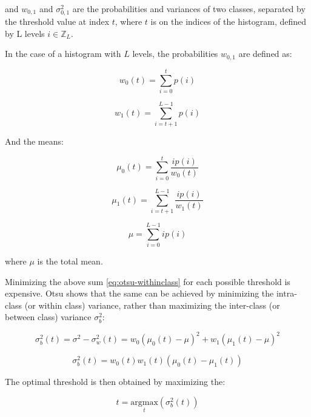 and $w_{0,1}$ and $\sigma_{0,1}^2$ are the probabilities and variances of two classes, separated by the threshold value at index $t$, where $t$ is on the indices of the histogram, defined by L levels $i \in \mathbb{Z}_L$. 

In the case of a histogram with $L$ levels, the probabilities $w_{0,1}$ are defined as:

\begin{equation}
w_0(t) = \sum_{i=0}^{t}{p(i)}
\end{equation}

\begin{equation}
w_1(t) = \sum_{i=t+1}^{L-1}{p(i)}
\end{equation}

And the means:

\begin{equation}
\mu_0(t) = \sum_{i=0}^{t}{\frac{i p(i)}{w_0(t)}}
\end{equation}

\begin{equation}
\mu_1(t) = \sum_{i=t+1}^{L-1}{\frac{i p(i)}{w_1(t)}}
\end{equation}

\begin{equation}
\mu = \sum_{i=0}^{L-1}{i p(i)}
\end{equation}

where $\mu$ is the total mean. 

Minimizing the above sum \ref{eq:otsu-withinclass} for each possible threshold is expensive. Otsu shows that the same can be achieved by minimizing the intra-class (or within class) variance, rather than maximizing the inter-class (or between class) variance $\sigma_b^2$:

\begin{equation}
\sigma_b^2(t) = \sigma^2 - \sigma_w^2(t) = w_0 \left(\mu_0(t) - \mu \right)^2 + w_1 \left(\mu_1(t) - \mu \right)^2 
\end{equation}

\begin{equation}
\sigma_b^2(t) = w_0(t) w_1(t) \left( \mu_0(t) - \mu_1(t) \right)
\label{eq:otsu_between_variance}
\end{equation}

The optimal threshold is then obtained by maximizing the:

\begin{equation}
t = \underset{t}{\mathrm{argmax}}\left(\sigma_b^2(t)\right)
\end{equation}

